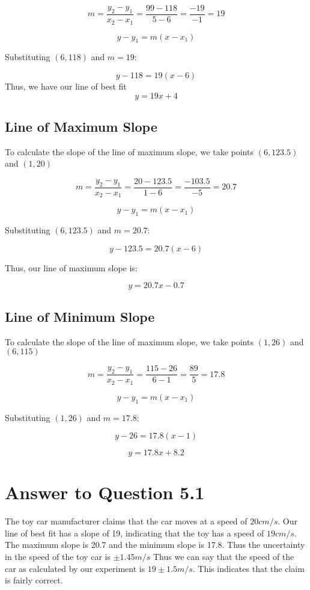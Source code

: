 \documentclass[12pt, letterpaper]{article}
\begin{document}
\[
m = \frac{y_2 - y_1}{x_2 - x_1} = \frac{99 - 118}{5 - 6} = \frac{-19}{-1} = 19
\]

\[
y - y_1 = m(x - x_1)
\]

Substituting $(6, 118)$ and $m = 19$:

\[
y - 118 = 19(x - 6)
\]
Thus, we have our line of best fit
\[
y = 19x + 4
\]

\subsection{Line of Maximum Slope}
To calculate the slope of the line of maximum slope, we take points $(6, 123.5)$ and $(1, 20)$

\[
m = \frac{y_2 - y_1}{x_2 - x_1} = \frac{20 - 123.5}{1 - 6} = \frac{-103.5}{-5} = 20.7
\]

\[
y - y_1 = m(x - x_1)
\]

Substituting $(6, 123.5)$ and $m = 20.7$:

\[
y - 123.5 = 20.7(x - 6)
\]

Thus, our line of maximum slope is:

\[
y = 20.7x - 0.7
\]

\subsection{Line of Minimum Slope}
To calculate the slope of the line of maximum slope, we take points $(1, 26)$ and $(6, 115)$

\[
m = \frac{y_2 - y_1}{x_2 - x_1} = \frac{115 - 26}{6 - 1} = \frac{89}{5} = 17.8
\]

\[
y - y_1 = m(x - x_1)
\]

Substituting $(1, 26)$ and $m = 17.8$:

\[
y - 26 = 17.8(x - 1)
\]

\[
y = 17.8x + 8.2
\]

\section{Answer to Question 5.1}

The toy car manufacturer claims that the car moves at a speed of $20cm/s$. Our line of best fit has a slope of 19, indicating that the toy has a speed of $19 cm/s$. The maximum slope is 20.7 and the minimum slope is 17.8. Thus the uncertainty in the speed of the toy car is $\pm 1.45m/s$ Thus we can say that the speed of the car as calculated by our experiment is $19 \pm1.5 m/s$. This indicates that the claim is fairly correct.
\end{document}
